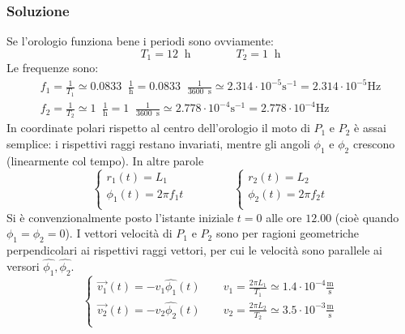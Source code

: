 \documentclass[12pt,a4paper]{book}
\begin{document}
\subsubsection*{Soluzione}
Se l'orologio funziona bene i periodi sono ovviamente:
%
\begin{equation*}
T_1=12 \; \; \text{h} \qquad \qquad T_2=1 \; \; \text{h}
\end{equation*}
%
Le frequenze sono:
%
\begin{gather*}
f_1=\frac{1}{T_1}\simeq 0.0833 \; \; \frac{1}{\text{h}}= 0.0833 \; \; \frac{1}{3600 \; \;  \text{s}} \simeq  2.314 \cdot 10^{-5} \text{s}^{-1}=2.314 \cdot 10^{-5} \text{Hz} \\
f_2=\frac{1}{T_2}\simeq 1 \; \; \frac{1}{\text{h}}= 1 \; \; \frac{1}{3600 \; \;  \text{s}} \simeq  2.778 \cdot 10^{-4} \text{s}^{-1}=2.778 \cdot 10^{-4}\text{Hz} 
\end{gather*}
%
In coordinate polari rispetto al centro dell'orologio il moto di $P_1$ e $P_2$ è assai semplice: i rispettivi raggi restano invariati, mentre gli angoli $\phi_1$ e $\phi_2$ crescono (linearmente col tempo). In altre parole
\begin{equation*}
 \left\{\begin{array}{lr}
  r_1(t)=L_1\\
  \phi_1(t)=2 \pi f_1 t \\
        \end{array}\right.
\qquad \qquad
 \left\{\begin{array}{lr}
  r_2(t)=L_2\\
  \phi_2(t)=2 \pi f_2 t \\
        \end{array}\right. 
\end{equation*}
Si è convenzionalmente posto l'istante iniziale $t=0$ alle ore $12.00$ (cioè quando $\phi_1=\phi_2=0$). I vettori velocità di $P_1$ e $P_2$ sono per ragioni geometriche
perpendicolari ai rispettivi raggi vettori, per cui le velocità sono parallele ai versori $\hat{\phi_1}, \hat{\phi_2}$. 
\begin{equation*}
 \left\{\begin{array}{lr}
 \vec{v_1}(t)= - v_1 \hat{\phi_1}(t) \qquad v_1= \frac{2 \pi L_1}{T_1} \simeq 1.4 \cdot 10^{-4} \frac{\text{m}}{\text{s}}\\
 \vec{v_2}(t)= - v_2 \hat{\phi_2}(t) \qquad v_2= \frac{2 \pi L_2}{T_2} \simeq 3.5 \cdot 10^{-3} \frac{\text{m}}{\text{s}}\\
        \end{array}\right.
\end{equation*}
\end{document}

